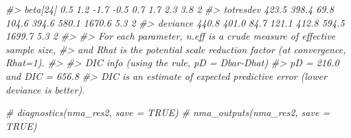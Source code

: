 \documentclass[
]{article}
\newenvironment{Shaded}{\begin{snugshade}}{\end{snugshade}}
\newcommand{\CommentTok}[1]{\textcolor[rgb]{0.56,0.35,0.01}{\textit{#1}}}
\begin{document}
\begin{Shaded}
\begin{Highlighting}[]
\CommentTok{\#\textgreater{} beta[24]    0.5   1.2  {-}1.7  {-}0.5   0.7   1.7    2.3  3.8     2}
\CommentTok{\#\textgreater{} totresdev 423.5 398.4  69.8 104.6 394.6 580.1 1670.6  5.3     2}
\CommentTok{\#\textgreater{} deviance  440.8 401.0  84.7 121.1 412.8 594.5 1699.7  5.3     2}
\CommentTok{\#\textgreater{} }
\CommentTok{\#\textgreater{} For each parameter, n.eff is a crude measure of effective sample size,}
\CommentTok{\#\textgreater{} and Rhat is the potential scale reduction factor (at convergence, Rhat=1).}
\CommentTok{\#\textgreater{} }
\CommentTok{\#\textgreater{} DIC info (using the rule, pD = Dbar{-}Dhat)}
\CommentTok{\#\textgreater{} pD = 216.0 and DIC = 656.8}
\CommentTok{\#\textgreater{} DIC is an estimate of expected predictive error (lower deviance is better).}

\CommentTok{\# diagnostics(nma\_res2, save = TRUE)}
\CommentTok{\# nma\_outputs(nma\_res2, save = TRUE)}
\end{Highlighting}
\end{Shaded}
\end{document}
